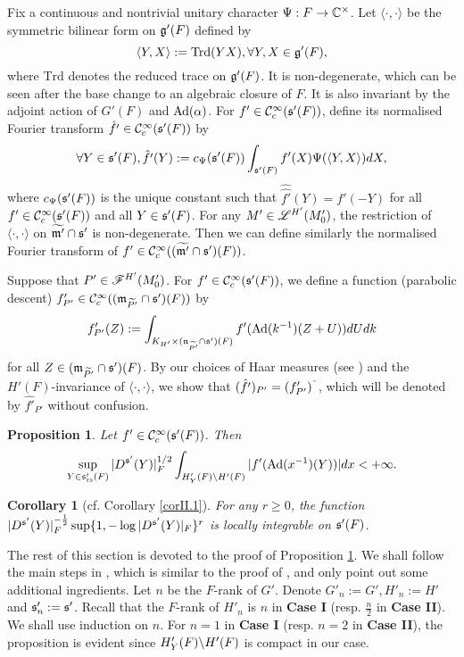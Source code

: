 \documentclass[a4paper]{amsart}
\newcommand{\fm}{{\mathfrak{m}}} \newcommand{\fn}{{\mathfrak{n}}}\newcommand{\fo}{{\mathfrak{o}}} \newcommand{\fp}{{\mathfrak{p}}}
\newcommand{\Trd}{{\mathrm{Trd}}}
\newcommand{\wt}{\widetilde}                        \newcommand{\wh}{\widehat}                      \newcommand{\wpair}[1]{\left\{{#1}\right\}}
\newtheorem{coro}[thm]{Corollary}
\newtheorem{prop}[thm]{Proposition}
\theoremstyle{definition}
\theoremstyle{remark}
\numberwithin{equation}{subsection}
\begin{document}
Fix a continuous and nontrivial unitary character $\Psi: F\rightarrow{\mathbb {C}}^\times$. Let $\langle\cdot,\cdot\rangle$ be the symmetric bilinear form on ${\mathfrak{g}}'(F)$ defined by
$$ \langle Y,X\rangle:=\Trd(YX),\forall Y,X\in\fg'(F), $$
where $\Trd$ denotes the reduced trace on ${\mathfrak{g}}'(F)$. It is non-degenerate, which can be seen after the base change to an algebraic closure of $F$. It is also invariant by the adjoint action of $G'(F)$ and ${\mathrm{Ad}}(\alpha)$. For $f'\in{\mathcal {C}}_c^\infty({\mathfrak{s}}'(F))$, define its normalised Fourier transform $\hat{f'}\in{\mathcal {C}}_c^\infty({\mathfrak{s}}'(F))$ by
\begin{equation}\label{fouriertransform2}
 \forall Y\in{\mathfrak{s}}'(F), \hat{f'}(Y):=c_\Psi({\mathfrak{s}}'(F)) \int_{{\mathfrak{s}}'(F)} f'(X) \Psi(\langle Y,X \rangle) dX, 
\end{equation}
where $c_\Psi({\mathfrak{s}}'(F))$ is the unique constant such that $\hat{\hat{f'}}(Y)=f'(-Y)$ for all $f'\in{\mathcal {C}}_c^\infty({\mathfrak{s}}'(F))$ and all $Y\in{\mathfrak{s}}'(F)$. For any $M'\in\mathscr{L}^{H'}(M'_0)$, the restriction of $\langle\cdot,\cdot\rangle$ on $\wt{\fm'}\cap\fs'$ is non-degenerate. Then we can define similarly the normalised Fourier transform of $f'\in\CC_c^\infty((\wt{\fm'}\cap\fs')(F))$. 

Suppose that $P'\in\mathscr{F}^{H'}(M'_0)$. For $f'\in{\mathcal {C}}_c^\infty({\mathfrak{s}}'(F))$, we define a function (parabolic descent) $f'_{P'}\in\CC_c^\infty((\fm_{\wt{P'}}\cap\fs')(F))$ by
\begin{equation}\label{pardes2}
 f'_{P'}(Z):=\int_{K_{H'}\times(\fn_{\wt{P'}}\cap\fs')(F)} f'(\Ad(k^{-1})(Z+U)) dUdk 
\end{equation}
for all $Z\in(\fm_{\wt{P'}}\cap\fs')(F)$. By our choices of Haar measures (see \cite[\S I.7]{MR1344131}) 
and the $H'(F)$-invariance of $\langle\cdot,\cdot\rangle$, we show that $(\hat{f'})_{P'}=(f'_{P'})^\string^$, which will be denoted by $\hat{f'}_{P'}$ without confusion. 

\begin{prop}\label{bdoi2}
Let $f'\in{\mathcal {C}}_c^\infty({\mathfrak{s}}'(F))$. Then
$$ \sup_{Y\in{\mathfrak{s}}'_{\mathrm{rs}}(F)}|D^{{\mathfrak{s}}'}(Y)|_F^{1/2} \int_{H'_Y(F)\backslash H'(F)} |f'({\mathrm{Ad}}(x^{-1})(Y))| dx<+\infty. $$
\end{prop}

\begin{coro}[cf. Corollary \ref{corII.1}]\label{corII.2}
For any $r\geq0$, the function $|D^{{\mathfrak{s}}'}(Y)|_F^{-\frac{1}{2}}\sup\{1, -\log |D^{{\mathfrak{s}}'}(Y)|_F\}^r$ is locally integrable on ${\mathfrak{s}}'(F)$. 
\end{coro}

The rest of this section is devoted to the proof of Proposition \ref{bdoi2}. We shall follow the main steps in \cite[\S6.3]{MR3414387}, which is similar to the proof of \cite[Theorem 13]{MR0414797}, and only point out some additional ingredients. Let $n$ be the $F$-rank of $G'$. Denote $G'_n:=G', H'_n:=H'$ and ${\mathfrak{s}}'_n:={\mathfrak{s}}'$. Recall that the $F$-rank of $H'_n$ is $n$ in \textbf{Case I} (resp. $\frac{n}{2}$ in \textbf{Case II}). We shall use induction on $n$. For $n=1$ in \textbf{Case I} (resp. $n=2$ in \textbf{Case II}), the proposition is evident since $H'_Y(F)\backslash H'(F)$ is compact in our case. 
\end{document}
